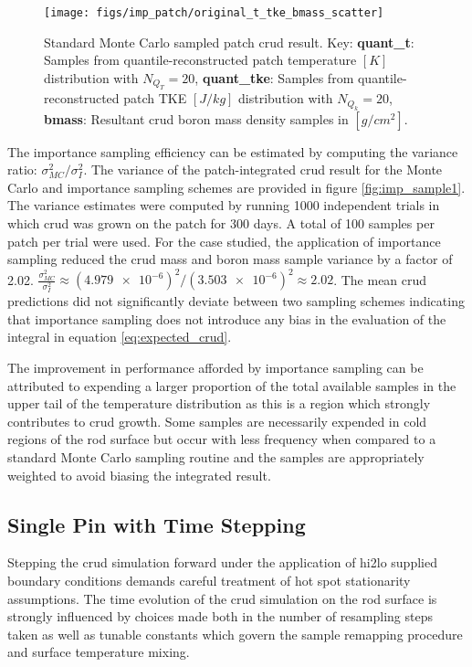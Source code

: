 \begin{figure}[H]
    \centering
    \texttt{[image: figs/imp\_patch/original\_t\_tke\_bmass\_scatter]}
    \caption[Standard Monte Carlo sampled patch crud result.]{Standard Monte Carlo sampled patch crud result. Key: \textbf{quant\_t}: Samples from quantile-reconstructed patch temperature $[K]$ distribution with $N_{Q_T}=20$,  \textbf{quant\_tke}: Samples from quantile-reconstructed patch TKE $[J/kg]$ distribution with $N_{Q_k}=20$,  \textbf{bmass}: Resultant crud boron mass density samples in $[g/cm^2]$.  }
    \label{fig:originalttkebmassscatter}
\end{figure}

The importance sampling efficiency can be estimated by computing the variance ratio:  $\sigma^2_{MC}/\sigma^2_{I}$.  The variance of the patch-integrated crud result for the Monte Carlo and importance sampling schemes are provided in figure \ref{fig:imp_sample1}.  The variance estimates were computed by running 1000 independent trials in which crud was grown on the patch for 300 days.  A total of 100 samples per patch per trial were used.  For the case studied, the application of importance sampling reduced the crud mass and boron mass sample variance by a factor of 2.02. $\frac{\sigma^2_{MC}}{\sigma^2_{I}} \approx (\num{4.979e-6})^2 / (\num{3.503e-6})^2  \approx 2.02$.  The mean crud predictions did not significantly deviate between two sampling schemes indicating that importance sampling does not introduce any bias in the evaluation of the integral in equation \ref{eq:expected_crud}.

The improvement in performance afforded by importance sampling can be attributed to expending a larger proportion of the total available samples in the upper tail of the temperature distribution as this is a region which strongly contributes to crud growth.  Some samples are necessarily expended in cold regions of the rod surface but occur with less frequency when compared to a standard Monte Carlo sampling routine and the samples are appropriately weighted to avoid biasing the integrated result.


\subsection{Single Pin with Time Stepping}

Stepping the crud simulation forward under the application of hi2lo supplied boundary conditions demands careful treatment of hot spot stationarity assumptions.  The time evolution of the crud simulation on the rod surface is strongly influenced by choices made both in the number of resampling steps taken as well as tunable constants which govern the sample remapping procedure and surface temperature mixing.

